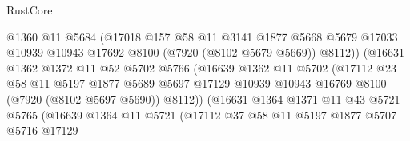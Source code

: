 \begin{lexlean}{RustCore}
\begin{coremodule}
                                @1360
                                @11
                                @5684
                                (@17018
                                  @157
                                  @58
                                  @11
                                  @3141
                                  @1877
                                  @5668
                                  @5679
                                  @17033
                                  @10939
                                  @10943
                                  @17692
                                  @8100
                                  (@7920 (@8102 @5679 @5669))
                                  @8112))
                              (@16631
                                @1362
                                @1372
                                @11
                                @52
                                @5702
                                @5766
                                (@16639
                                  @1362
                                  @11
                                  @5702
                                  (@17112
                                    @23
                                    @58
                                    @11
                                    @5197
                                    @1877
                                    @5689
                                    @5697
                                    @17129
                                    @10939
                                    @10943
                                    @16769
                                    @8100
                                    (@7920 (@8102 @5697 @5690))
                                    @8112))
                                (@16631
                                  @1364
                                  @1371
                                  @11
                                  @43
                                  @5721
                                  @5765
                                  (@16639
                                    @1364
                                    @11
                                    @5721
                                    (@17112
                                      @37
                                      @58
                                      @11
                                      @5197
                                      @1877
                                      @5707
                                      @5716
                                      @17129

\end{coremodule}
\end{lexlean}
